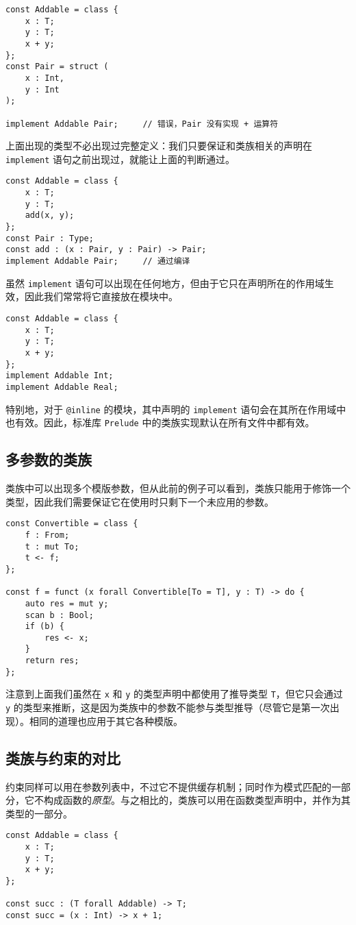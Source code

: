 \begin{lstlisting}
const Addable = class {
	x : T;
	y : T;
	x + y;
};
const Pair = struct (
	x : Int,
	y : Int
);

implement Addable Pair;		// 错误，Pair 没有实现 + 运算符
\end{lstlisting}

上面出现的类型不必出现过完整定义：我们只要保证和类族相关的声明在 \lstinline!implement! 语句之前出现过，就能让上面的判断通过。

\begin{lstlisting}
const Addable = class {
	x : T;
	y : T;
	add(x, y);
};
const Pair : Type;
const add : (x : Pair, y : Pair) -> Pair;
implement Addable Pair;		// 通过编译
\end{lstlisting}

虽然 \lstinline!implement! 语句可以出现在任何地方，但由于它只在声明所在的作用域生效，因此我们常常将它直接放在模块中。

\begin{lstlisting}
const Addable = class {
	x : T;
	y : T;
	x + y;
};
implement Addable Int;
implement Addable Real;
\end{lstlisting}

特别地，对于 \lstinline!@inline! 的模块，其中声明的 \lstinline!implement! 语句会在其所在作用域中也有效。因此，标准库 \lstinline!Prelude! 中的类族实现默认在所有文件中都有效。

\subsection{多参数的类族}

类族中可以出现多个模版参数，但从此前的例子可以看到，类族只能用于修饰一个类型，因此我们需要保证它在使用时只剩下一个未应用的参数。

\begin{lstlisting}
const Convertible = class {
	f : From;
	t : mut To;
	t <- f;
};

const f = funct (x forall Convertible[To = T], y : T) -> do {
	auto res = mut y;
	scan b : Bool;
	if (b) {
		res <- x;
	}
	return res;
};
\end{lstlisting}

注意到上面我们虽然在 \lstinline!x! 和 \lstinline!y! 的类型声明中都使用了推导类型 \lstinline!T!，但它只会通过 \lstinline!y! 的类型来推断，这是因为类族中的参数不能参与类型推导（尽管它是第一次出现）。相同的道理也应用于其它各种模版。

\subsection{类族与约束的对比}

约束同样可以用在参数列表中，不过它不提供缓存机制；同时作为模式匹配的一部分，它不构成函数的\emph{原型}。与之相比的，类族可以用在函数类型声明中，并作为其类型的一部分。

\begin{lstlisting}
const Addable = class {
	x : T;
	y : T;
	x + y;
};

const succ : (T forall Addable) -> T;
const succ = (x : Int) -> x + 1;
\end{lstlisting}

